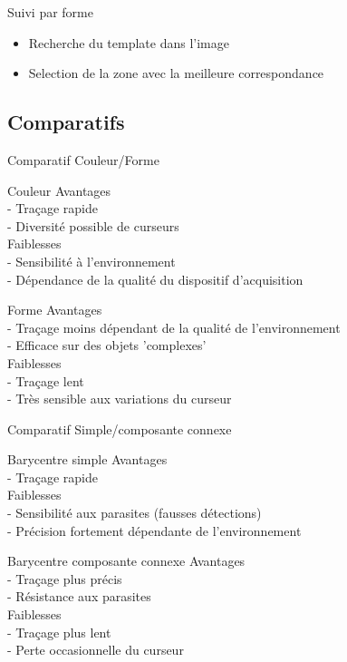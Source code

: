 \documentclass{beamer}
\begin{document}
		\begin{frame}{Suivi par forme}
			\begin{itemize}
				\item{Recherche du template dans l'image}
				\item{Selection de la zone avec la meilleure correspondance}
			\end{itemize}
		\end{frame}
		\subsection{Comparatifs}
		\begin{frame}{Comparatif Couleur/Forme}
		\pause
			\begin{block}{Couleur}
				Avantages \\
				- Traçage rapide \\
				- Diversité possible de curseurs \\
				Faiblesses \\
				- Sensibilité à l'environnement\\
				- Dépendance de la qualité du dispositif d'acquisition\\
			\end{block}
			\pause
			\begin{block}{Forme}
				Avantages \\
				- Traçage moins dépendant de la qualité de l'environnement \\
				- Efficace sur des objets 'complexes'\\
				Faiblesses \\
				- Traçage lent \\
				- Très sensible aux variations du curseur\\
			\end{block}
		\end{frame}
		\begin{frame}{Comparatif Simple/composante connexe}
		\pause
			\begin{block}{Barycentre simple}
				Avantages \\
				- Traçage rapide \\
				Faiblesses \\
				- Sensibilité aux parasites (fausses détections)\\
				- Précision fortement dépendante de l'environnement\\
			\end{block}
			\pause
			\begin{block}{Barycentre composante connexe}
				Avantages \\
				- Traçage plus précis \\
				- Résistance aux parasites \\
				Faiblesses \\
				- Traçage plus lent \\
				- Perte occasionnelle du curseur
			\end{block}
		\end{frame}
\end{document}
